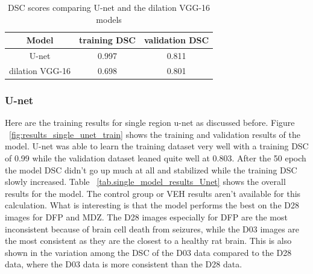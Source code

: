 \begin{table}[tbh]
\renewcommand{\arraystretch}{1}
\centering
\begin{tabular}{|c|c|c|}
\hline
\textbf{Model} & \textbf{training DSC} & \textbf{validation DSC}\\
\hline
U-net & 0.997 & 0.811\\ %
\hline
dilation VGG-16 & 0.698 & 0.801\\ %
\hline
\end{tabular}
\caption{DSC scores comparing U-net and the dilation VGG-16 models}
\label{tab.single_model_results}
\end{table}


\subsubsection{U-net}
    Here are the training results for single region u-net as discussed before. 
    Figure ~\ref{fig:results_single_unet_train} shows the training and validation results of the model. 
    U-net was able to learn the training dataset very well with a training DSC of 0.99 while the validation dataset leaned quite well at 0.803.
    After the 50 epoch the model DSC didn't go up much at all and stabilized while the training DSC slowly increased.
    Table ~\ref{tab.single_model_results_Unet} shows the overall results for the model. 
    The control group or VEH results aren't available for this calculation.
    What is interesting is that the model performs the best on the D28 images for DFP and MDZ. 
    The D28 images especially for DFP are the most inconsistent because of brain cell death from seizures, while the D03 images are the most consistent as they are the closest to a healthy rat brain. 
    This is also shown in the variation among the DSC of the D03 data compared to the D28 data, where the D03 data is more consistent than the D28 data. 
    
